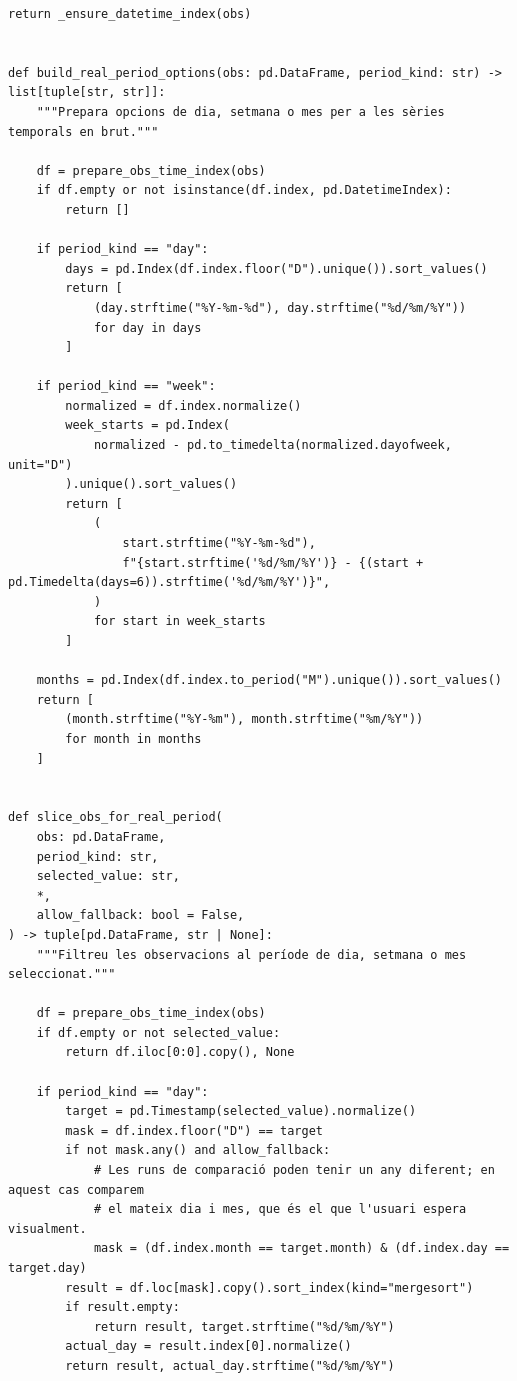 \documentclass[10pt,a4paper]{article}
\begin{document}
\begin{lstlisting}[style=studioPython,caption={backend/resultats\_backend.py},label={lst:backend-resultats-backend-py}]
    return _ensure_datetime_index(obs)


def build_real_period_options(obs: pd.DataFrame, period_kind: str) -> list[tuple[str, str]]:
    """Prepara opcions de dia, setmana o mes per a les sèries temporals en brut."""

    df = prepare_obs_time_index(obs)
    if df.empty or not isinstance(df.index, pd.DatetimeIndex):
        return []

    if period_kind == "day":
        days = pd.Index(df.index.floor("D").unique()).sort_values()
        return [
            (day.strftime("%Y-%m-%d"), day.strftime("%d/%m/%Y"))
            for day in days
        ]

    if period_kind == "week":
        normalized = df.index.normalize()
        week_starts = pd.Index(
            normalized - pd.to_timedelta(normalized.dayofweek, unit="D")
        ).unique().sort_values()
        return [
            (
                start.strftime("%Y-%m-%d"),
                f"{start.strftime('%d/%m/%Y')} - {(start + pd.Timedelta(days=6)).strftime('%d/%m/%Y')}",
            )
            for start in week_starts
        ]

    months = pd.Index(df.index.to_period("M").unique()).sort_values()
    return [
        (month.strftime("%Y-%m"), month.strftime("%m/%Y"))
        for month in months
    ]


def slice_obs_for_real_period(
    obs: pd.DataFrame,
    period_kind: str,
    selected_value: str,
    *,
    allow_fallback: bool = False,
) -> tuple[pd.DataFrame, str | None]:
    """Filtreu les observacions al període de dia, setmana o mes seleccionat."""

    df = prepare_obs_time_index(obs)
    if df.empty or not selected_value:
        return df.iloc[0:0].copy(), None

    if period_kind == "day":
        target = pd.Timestamp(selected_value).normalize()
        mask = df.index.floor("D") == target
        if not mask.any() and allow_fallback:
            # Les runs de comparació poden tenir un any diferent; en aquest cas comparem
            # el mateix dia i mes, que és el que l'usuari espera visualment.
            mask = (df.index.month == target.month) & (df.index.day == target.day)
        result = df.loc[mask].copy().sort_index(kind="mergesort")
        if result.empty:
            return result, target.strftime("%d/%m/%Y")
        actual_day = result.index[0].normalize()
        return result, actual_day.strftime("%d/%m/%Y")


\end{lstlisting}
\end{document}
